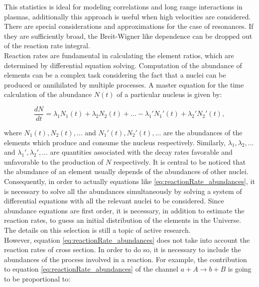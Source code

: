 \documentclass[openany]{book}
\begin{document}
This statistics is ideal for modeling correlations and long range interactions in plasmas, additionally this approach is useful when high velocities are considered. \\

There are special considerations and approximations for the case of resonances. If they are sufficiently broad, the Breit-Wigner like dependence can be dropped out of the reaction rate integral. \\

 Reaction rates are fundamental in calculating the element ratios, which are determined by differential equation solving. Computation of the abundance of elements can be a complex task considering the fact that a nuclei can be produced or annihilated by multiple processes. A master equation for the time calculation of the abundance $N(t)$ of a particular nucleus is given by:
 
 \begin{equation}\label{eq:reactionRate_abundances}
 	\frac{dN}{dt} = \lambda_1 N_1(t) + \lambda_2 N_2(t)  + ... -  \lambda_1' N_1'(t) + \lambda_2' N_2'(t),
 \end{equation}

where $N_1(t), N_2(t), ...$ and $N_1'(t), N_2'(t), ...$ are the abundances of the elements which produce and consume the nucleus respectively. Similarly,  $\lambda_1, \lambda_2, ...$ and  $\lambda_1', \lambda_2', ...$ are quantities associated with the decay rates favorable and unfavorable to the production of $N$ respectively. It is central to be noticed that the abundance of an element usually depends of the abundances of other nuclei. Consequently, in order to actually equations like \ref{eq:reactionRate_abundances}, it is necessary to solve all the abundances simultaneously by solving a system of differential equations with all the relevant nuclei to be considered. Since abundance equations are first order, it is necessary, in addition to estimate the reaction rates, to guess an initial distribution of the elements in the Universe. The details on this selection is still a topic of active research. \\

However, equation \ref{eq:reactionRate_abundances} does not take into account the reaction rates of cross section. In order to do so, it is necessary to include the abundances of the process involved in a reaction. For example, the contribution to equation \ref{eq:reactionRate_abundances} of the channel $a + A \rightarrow b + B$ is going to be proportional to: 
\end{document}
